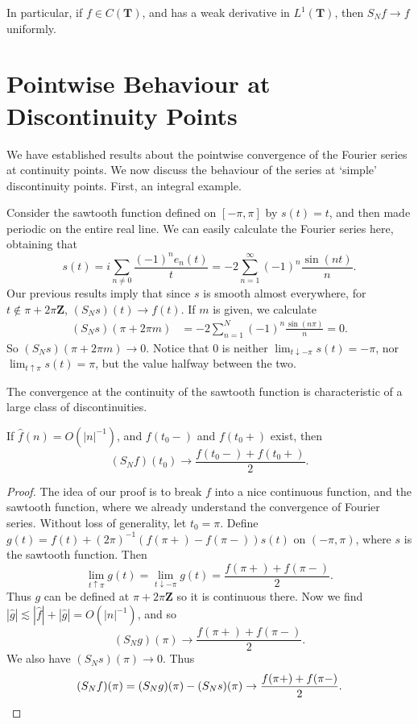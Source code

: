 In particular, if $f \in C(\mathbf{T})$, and has a weak derivative in $L^1(\mathbf{T})$, then $S_N f \to f$ uniformly.

\section{Pointwise Behaviour at Discontinuity Points}

We have established results about the pointwise convergence of the Fourier series at continuity points. We now discuss the behaviour of the series at `simple' discontinuity points. First, an integral example.

\begin{example}
	Consider the sawtooth function defined on $[-\pi,\pi]$ by $s(t) = t$, and then made periodic on the entire real line. We can easily calculate the Fourier series here, obtaining that
	\[ s(t) = i \sum_{n \neq 0} \frac{(-1)^n e_n(t)}{t} = -2 \sum_{n = 1}^\infty (-1)^n \frac{\sin(nt)}{n}. \]
	Our previous results imply that since $s$ is smooth almost everywhere, for $t \not \in \pi + 2\pi \mathbf{Z}$, $(S_N s)(t) \to f(t)$. If $m$ is given, we calculate
	\begin{align*}
		(S_N s)(\pi + 2 \pi m) &= -2 \sum_{n = 1}^N (-1)^n \frac{\sin(n\pi)}{n} = 0.
	\end{align*}
	So $(S_N s)(\pi + 2 \pi m) \to 0$. Notice that $0$ is neither $\lim_{t \downarrow -\pi} s(t) = -\pi$, nor $\lim_{t \uparrow \pi} s(t) = \pi$, but the value halfway between the two.
\end{example}

The convergence at the continuity of the sawtooth function is characteristic of a large class of discontinuities.

\begin{theorem}
	If $\widehat{f}(n) = O(|n|^{-1})$, and $f(t_0-)$ and $f(t_0+)$ exist, then
	\[ (S_N f)(t_0) \to \frac{f(t_0-) + f(t_0+)}{2}. \]
\end{theorem}
\begin{proof}
	The idea of our proof is to break $f$ into a nice continuous function, and the sawtooth function, where we already understand the convergence of Fourier series. Without loss of generality, let $t_0 = \pi$. Define $g(t) = f(t) + (2\pi)^{-1} (f(\pi+) - f(\pi-)) s(t)$ on $(-\pi,\pi)$, where $s$ is the sawtooth function. Then
	\[ \lim_{t \uparrow \pi} g(t) = \lim_{t \downarrow -\pi} g(t) = \frac{f(\pi+) + f(\pi-)}{2}. \]
	Thus $g$ can be defined at $\pi + 2 \pi \mathbf{Z}$ so it is continuous there. Now we find $|\widehat{g}| \lesssim |\widehat{f}| + |\widehat{g}| = O(|n|^{-1})$, and so
	\[ (S_N g)(\pi) \to \frac{f(\pi+) + f(\pi-)}{2}. \]
	We also have $(S_N s)(\pi) \to 0$. Thus
	\[ (S_N f)(\pi) = (S_N g)(\pi) - (S_N s)(\pi) \to \frac{f(\pi+) + f(\pi-)}{2}. \qedhere \]
\end{proof}

